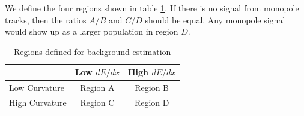 We define the four regions shown in table \ref{tab:MplTrackBackgroundABCD}.  If there is no signal from monopole tracks, then the ratios $A/B$ and $C/D$ should be equal.  Any monopole signal would show up as a larger population in region $D$.

\begin{table}
\centering
\begin{tabular}{l|c|c|}
 & Low $dE/dx$ & High $dE/dx$ \\
\hline
Low Curvature & Region A & Region B \\
\hline
High Curvature & Region C & Region D \\
\hline
\end{tabular}
\caption{Regions defined for background estimation}
\label{tab:MplTrackBackgroundABCD}
\end{table}

